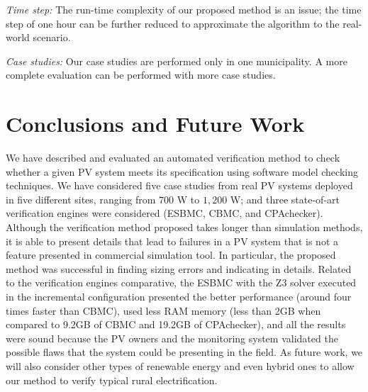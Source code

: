 \documentclass[review]{elsarticle}
\begin{document}
\textit{Time step:} The run-time complexity of our proposed method is an issue; the time step of one hour can be further reduced to approximate the algorithm to the real-world scenario.

\textit{Case studies:} Our case studies are performed only in one municipality. A more complete evaluation can be performed with more case studies.

\section{Conclusions and Future Work}
\label{sec:Conclusions}
We have described and evaluated an automated verification method to check whether a given PV system meets its specification using software model checking techniques. We have considered five case studies from real PV systems deployed in five different sites, ranging from $700$ W to $1,200$ W; and three state-of-art verification engines were considered (ESBMC, CBMC, and CPAchecker). Although the verification method proposed takes longer than simulation methods, it is able to present details that lead to failures in a PV system that is not a feature presented in commercial simulation tool. In particular, the proposed method was successful in finding sizing errors and indicating in details. Related to the verification engines comparative, the ESBMC with the Z3 solver executed in the incremental configuration presented the better performance (around four times faster than CBMC), used less RAM memory (less than 2GB when compared to 9.2GB of CBMC and 19.2GB of CPAchecker), and all the results were sound because the PV owners and the monitoring system validated the possible flaws that the system could be presenting in the field.
As future work, we will also consider other types of renewable energy and even hybrid ones to allow our method to verify typical rural electrification.
%
\end{document}
